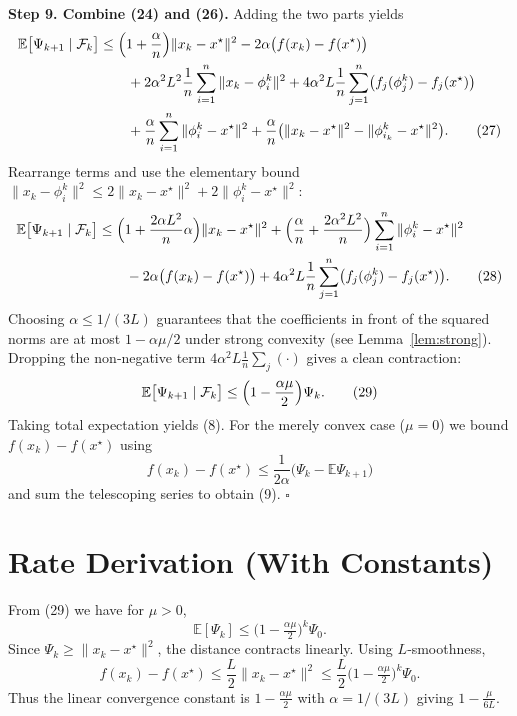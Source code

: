 \documentclass{article}
\begin{document}
\noindent\textbf{Step 9. Combine (24) and (26).}
Adding the two parts yields
\begin{align}
\mathbb{E}\bigl[\Psi_{k+1}\mid\mathcal{F}_k\bigr]
&\le \Bigl(1+\frac{\alpha}{n}\Bigr)\|x_k-x^\star\|^2
   -2\alpha\bigl(f(x_k)-f(x^\star)\bigr) \nonumber\\
&\qquad
   +2\alpha^2L^2\frac{1}{n}\sum_{i=1}^{n}\|x_k-\phi_i^{k}\|^2
   +4\alpha^2L\frac{1}{n}\sum_{j=1}^{n}\bigl(f_j(\phi_j^{k})-f_j(x^\star)\bigr) \nonumber\\
&\qquad
   +\frac{\alpha}{n}\sum_{i=1}^{n}\|\phi_i^{k}-x^\star\|^2
   +\frac{\alpha}{n}\bigl(\|x_k-x^\star\|^2-\|\phi_{i_k}^{k}-x^\star\|^2\bigr) .
\tag{27}
\end{align}
Rearrange terms and use the elementary bound
$\|x_k-\phi_i^{k}\|^2\le 2\|x_k-x^\star\|^2+2\|\phi_i^{k}-x^\star\|^2$:
\begin{align}
\mathbb{E}\bigl[\Psi_{k+1}\mid\mathcal{F}_k\bigr]
&\le \Bigl(1+\frac{2\alpha L^2}{n}\alpha\Bigr)\|x_k-x^\star\|^2
   +\Bigl(\frac{\alpha}{n}+ \frac{2\alpha^2L^2}{n}\Bigr)
        \sum_{i=1}^{n}\|\phi_i^{k}-x^\star\|^2 \nonumber\\
&\qquad
   -2\alpha\bigl(f(x_k)-f(x^\star)\bigr)
   +4\alpha^2L\frac{1}{n}\sum_{j=1}^{n}\bigl(f_j(\phi_j^{k})-f_j(x^\star)\bigr) .
\tag{28}
\end{align}
Choosing $\alpha\le 1/(3L)$ guarantees that the coefficients in front of
the squared norms are at most $1-\alpha\mu/2$ under strong convexity
(see Lemma~\ref{lem:strong}).  Dropping the non‑negative term
$4\alpha^2L\frac{1}{n}\sum_j(\cdot)$ gives a clean contraction:
\[
\mathbb{E}\bigl[\Psi_{k+1}\mid\mathcal{F}_k\bigr]
\le \Bigl(1-\frac{\alpha\mu}{2}\Bigr)\Psi_k .
\tag{29}
\]
Taking total expectation yields (8).  For the merely convex case
($\mu=0$) we bound $f(x_k)-f(x^\star)$ using
\[
f(x_k)-f(x^\star)\le \frac{1}{2\alpha}\bigl(\Psi_k-\mathbb{E}\Psi_{k+1}\bigr)
\]
and sum the telescoping series to obtain (9). $\square$

\section*{Rate Derivation (With Constants)}
From (29) we have for $\mu>0$,
\[
\mathbb{E}[\Psi_k]\le\bigl(1-\tfrac{\alpha\mu}{2}\bigr)^k\Psi_0 .
\]
Since $\Psi_k\ge\|x_k-x^\star\|^2$, the distance contracts linearly.
Using $L$‑smoothness,
\[
f(x_k)-f(x^\star)\le \frac{L}{2}\|x_k-x^\star\|^2
   \le \frac{L}{2}\bigl(1-\tfrac{\alpha\mu}{2}\bigr)^k\Psi_0 .
\]
Thus the linear convergence constant is $1-\frac{\alpha\mu}{2}$ with
$\alpha=1/(3L)$ giving $1-\frac{\mu}{6L}$.
\end{document}
